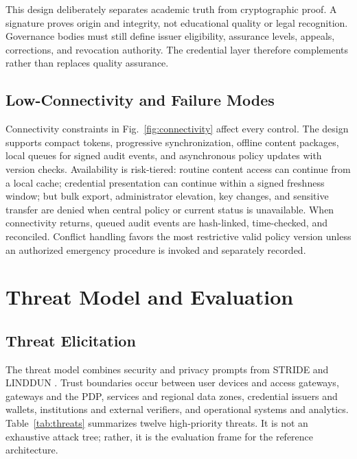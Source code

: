 \documentclass[journal]{IEEEtran}
\begin{document}
This design deliberately separates academic truth from cryptographic proof. A signature proves origin and integrity, not educational quality or legal recognition. Governance bodies must still define issuer eligibility, assurance levels, appeals, corrections, and revocation authority. The credential layer therefore complements rather than replaces quality assurance.

\subsection{Low-Connectivity and Failure Modes}
Connectivity constraints in Fig.~\ref{fig:connectivity} affect every control. The design supports compact tokens, progressive synchronization, offline content packages, local queues for signed audit events, and asynchronous policy updates with version checks. Availability is risk-tiered: routine content access can continue from a local cache; credential presentation can continue within a signed freshness window; but bulk export, administrator elevation, key changes, and sensitive transfer are denied when central policy or current status is unavailable. When connectivity returns, queued audit events are hash-linked, time-checked, and reconciled. Conflict handling favors the most restrictive valid policy version unless an authorized emergency procedure is invoked and separately recorded.

\section{Threat Model and Evaluation}
\subsection{Threat Elicitation}
The threat model combines security and privacy prompts from STRIDE and LINDDUN \cite{shostack2014,deng2011}. Trust boundaries occur between user devices and access gateways, gateways and the PDP, services and regional data zones, credential issuers and wallets, institutions and external verifiers, and operational systems and analytics. Table~\ref{tab:threats} summarizes twelve high-priority threats. It is not an exhaustive attack tree; rather, it is the evaluation frame for the reference architecture.
\end{document}
